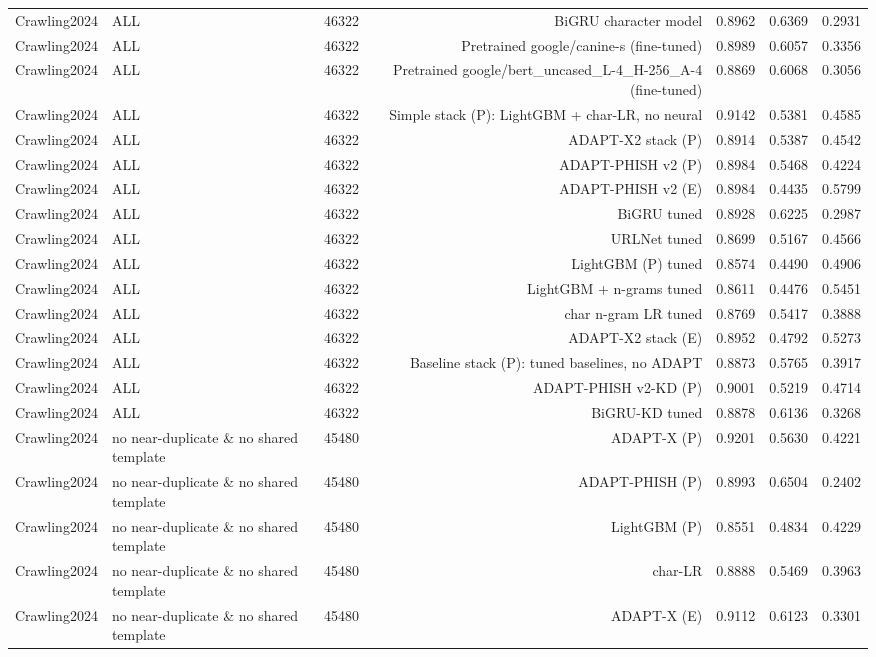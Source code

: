 \begin{table}[t]
\begin{tabular}{llrrrrr}
Crawling2024 & ALL & 46322 & BiGRU character model & 0.8962 & 0.6369 & 0.2931 \\
Crawling2024 & ALL & 46322 & Pretrained google/canine-s (fine-tuned) & 0.8989 & 0.6057 & 0.3356 \\
Crawling2024 & ALL & 46322 & Pretrained google/bert\_uncased\_L-4\_H-256\_A-4 (fine-tuned) & 0.8869 & 0.6068 & 0.3056 \\
Crawling2024 & ALL & 46322 & Simple stack (P): LightGBM + char-LR, no neural & 0.9142 & 0.5381 & 0.4585 \\
Crawling2024 & ALL & 46322 & ADAPT-X2 stack (P) & 0.8914 & 0.5387 & 0.4542 \\
Crawling2024 & ALL & 46322 & ADAPT-PHISH v2 (P) & 0.8984 & 0.5468 & 0.4224 \\
Crawling2024 & ALL & 46322 & ADAPT-PHISH v2 (E) & 0.8984 & 0.4435 & 0.5799 \\
Crawling2024 & ALL & 46322 & BiGRU tuned & 0.8928 & 0.6225 & 0.2987 \\
Crawling2024 & ALL & 46322 & URLNet tuned & 0.8699 & 0.5167 & 0.4566 \\
Crawling2024 & ALL & 46322 & LightGBM (P) tuned & 0.8574 & 0.4490 & 0.4906 \\
Crawling2024 & ALL & 46322 & LightGBM + n-grams tuned & 0.8611 & 0.4476 & 0.5451 \\
Crawling2024 & ALL & 46322 & char n-gram LR tuned & 0.8769 & 0.5417 & 0.3888 \\
Crawling2024 & ALL & 46322 & ADAPT-X2 stack (E) & 0.8952 & 0.4792 & 0.5273 \\
Crawling2024 & ALL & 46322 & Baseline stack (P): tuned baselines, no ADAPT & 0.8873 & 0.5765 & 0.3917 \\
Crawling2024 & ALL & 46322 & ADAPT-PHISH v2-KD (P) & 0.9001 & 0.5219 & 0.4714 \\
Crawling2024 & ALL & 46322 & BiGRU-KD tuned & 0.8878 & 0.6136 & 0.3268 \\
Crawling2024 & no near-duplicate \& no shared template & 45480 & ADAPT-X (P) & 0.9201 & 0.5630 & 0.4221 \\
Crawling2024 & no near-duplicate \& no shared template & 45480 & ADAPT-PHISH (P) & 0.8993 & 0.6504 & 0.2402 \\
Crawling2024 & no near-duplicate \& no shared template & 45480 & LightGBM (P) & 0.8551 & 0.4834 & 0.4229 \\
Crawling2024 & no near-duplicate \& no shared template & 45480 & char-LR & 0.8888 & 0.5469 & 0.3963 \\
Crawling2024 & no near-duplicate \& no shared template & 45480 & ADAPT-X (E) & 0.9112 & 0.6123 & 0.3301 \\

\end{tabular}
\end{table}

